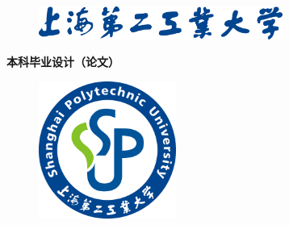 \pagestyle{empty}
\linespread{0.8}
\vspace*{\fill}
\begin{figure}[htbp!]
    \centering
    \includegraphics[width=8cm]{../res/title.eps}
\end{figure}
\begin{center}
    \sffamily\bfseries
    本科毕业设计（论文）
\end{center}

\begin{figure}[htbp!]
    \centering
    \includegraphics[height=4.5cm,width=4.5cm]{../res/logo.eps}
\end{figure}

